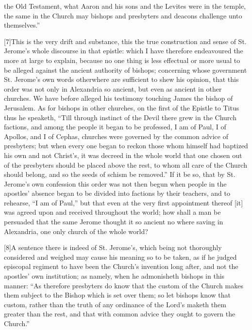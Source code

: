 the Old Testament, what Aaron  and his sons and the Levites were in the temple,
 the same in the Church may bishops and presbyters and deacons challenge unto themselves.”

[7]This is the very drift and substance, this the true construction and sense of St. Jerome’s whole discourse in that epistle: which I have therefore endeavoured the more at large to explain, because no one thing is less effectual or more usual to be alleged against the ancient authority of bishops; concerning whose government St. Jerome’s own words otherwhere are sufficient to shew his opinion, that this order was not only in Alexandria so ancient, but even as ancient in other churches. We have before alleged his testimony touching James the bishop of Jerusalem. As for bishops in other churches, on the first of the Epistle to Titus thus he speaketh, “Till through instinct of the Devil there grew in the Church factions, and among the people it began to be professed, I am of Paul, I of Apollos, and I of Cephas, churches were governed by the common advice  of presbyters;
 but when every one began to reckon those whom himself had baptized his own and not Christ’s, it was decreed in the whole world that one chosen out of the presbyters should be placed above the rest, to whom all care of the Church should belong, and so the seeds of schism be removed.” If it be so, that by St. Jerome’s own confession this order was not then begun when people in the apostles’ absence began to be divided into factions by their teachers, and to rehearse, “I am of Paul,” but that even at the very first appointment thereof [it] was agreed upon and received throughout the world; how shall a man be persuaded that the same Jerome thought it so ancient no where saving in Alexandria, one only church of the whole world?

[8]A sentence there is indeed of St. Jerome’s, which being not thoroughly considered and weighed may cause his meaning so to be taken, as if he judged episcopal regiment to have been the Church’s invention long after, and not the apostles’ own institution; as namely, when he admonisheth bishops in this manner: “As therefore presbyters do know that the custom of the Church makes them subject to the Bishop which is set over them; so let bishops know that custom, rather than the truth of any ordinance of the Lord’s maketh  them greater than the rest, and that with common advice they ought to govern the Church.”

